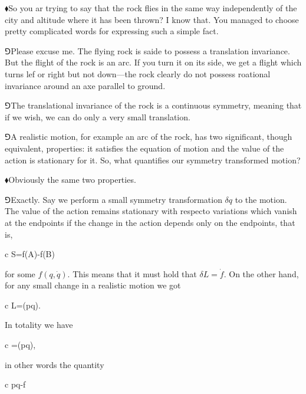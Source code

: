 \documentclass[10pt,oneside%
]{memoir}
\newenvironment{eqna}{\begin{IEEEeqnarray*}{c}}{\end{IEEEeqnarray*}\ignorespacesafterend}
\newcommand{\der}[2]{\frac{\dd#1}{\dd#2}}
\newcommand{\dd}{\mathrm{d}}
\newcommand{\hea}{\(\blacklozenge\)\;}
\newcommand{\heb}{\(\Game\)\;}
\begin{document}
\hea So you ar trying to say that the rock flies in the same way independently of the city and altitude where it has been thrown? I know that. You managed to choose pretty complicated words for expressing such a simple fact.

\heb Please excuse me. The flying rock is saide to possess a translation invariance. But the flight of the rock is an arc. If you turn it on its side, we get a flight which turns lef or right but not down---the rock clearly do not possess roational invariance around an axe parallel to ground.

\heb The translational invariance of the rock is a continuous symmetry, meaning that if we wish, we can do only a very small translation.

\heb A realistic motion, for example an arc of the rock, has two significant, though equivalent, properties: it satisfies the equation of motion and the value of the action is stationary for it. So, what quantifies our symmetry transformed motion?

\hea Obviously the same two properties.

\heb Exactly. Say we perform a small symmetry transformation \(\delta q\) to the motion. The value of the action remains stationary with respecto variations which vanish at the endpoints if the change in the action depends only on the endpoints, that is,
\begin{eqna}
    \delta S=f(A)-f(B)
\end{eqna}
for some \(f(q,\dot{q})\). This means that it must hold that \(\delta L=\dot{f}\). On the other hand, for any small change in a realistic motion we got
\begin{eqna}
    \delta L=\der{}{t}(p\cdot\delta q).
\end{eqna}
In totality we have
\begin{eqna}
    =\der{}{t}(p\cdot\delta q),
\end{eqna}
in other words the quantity
\begin{eqna}
    p\cdot\delta q-f
\end{eqna}











\end{document}
